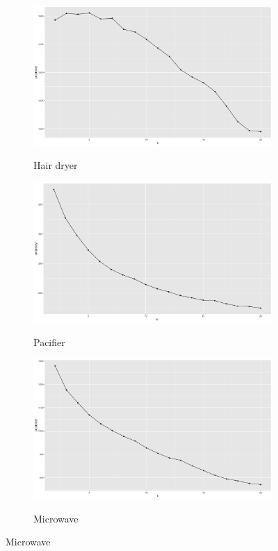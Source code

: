 \documentclass[reqno]{article}
\theoremstyle{definition}
\theoremstyle{definition}
\theoremstyle{remark}
\begin{document}
\begin{figure}[htbp]
\caption{Perplexity score against k for 3 products:}
\begin{subfigure}{\textwidth}
\begin{center}
    \includegraphics[width= .7\linewidth]{hair_dryer_perplexity.png}
    \label{fig:sfig1}
    \caption{Hair dryer}
\end{center}
\end{subfigure}
\begin{subfigure}{\textwidth}
\begin{center}
    \includegraphics[width= .7\linewidth]{pacifier_perplexity.png}
    \label{fig:sfig2}
    \caption{Pacifier}
\end{center}
\end{subfigure}
\begin{subfigure}{\textwidth}
\begin{center}
    \includegraphics[width= .7\linewidth]{microwave_perplexity.png}
    \label{fig:sfig3}
    \caption{Microwave}
    \end{center}
\end{subfigure}
\end{figure}
\end{document}
